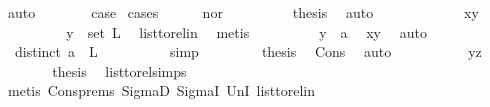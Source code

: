 \begin{isabellebody}
\ auto\isanewline
\ \ \ \ \isamarkupfalse%
\ \isamarkupfalse%
\ {\isacharquery}{\kern0pt}case\ \isamarkupfalse%
{\isacharparenleft}{\kern0pt}cases{\isacharparenright}{\kern0pt}\isanewline
\ \ \ \ \isamarkupfalse%
\ nor\isanewline
\ \ \ \ \ \ \isamarkupfalse%
\ \isamarkupfalse%
\ {\isacharquery}{\kern0pt}thesis\ \isamarkupfalse%
\ auto\isanewline
\ \ \ \ \isamarkupfalse%
\isanewline
\ \ \ \ \ \ \isamarkupfalse%
\ xy\ \isanewline
\ \ \ \ \ \ \isamarkupfalse%
\ \isamarkupfalse%
\ {\isachardoublequoteopen}y\ {\isasymin}\ set\ L{\isachardoublequoteclose}\ \isamarkupfalse%
\ list{\isacharunderscore}{\kern0pt}to{\isacharunderscore}{\kern0pt}rel{\isacharunderscore}{\kern0pt}in\ \isamarkupfalse%
\ metis\isanewline
\ \ \ \ \ \ \isamarkupfalse%
\ \isamarkupfalse%
\ {\isachardoublequoteopen}y\ {\isacharequal}{\kern0pt}\ a{\isachardoublequoteclose}\ \isamarkupfalse%
\ xy\ \isamarkupfalse%
\ auto\isanewline
\ \ \ \ \ \ \isamarkupfalse%
\ \isamarkupfalse%
\ {\isachardoublequoteopen}{\isasymnot}\ distinct\ {\isacharparenleft}{\kern0pt}a\ {\isacharhash}{\kern0pt}\ L{\isacharparenright}{\kern0pt}{\isachardoublequoteclose}\isanewline
\ \ \ \ \ \ \ \ \isamarkupfalse%
\ simp\ \isanewline
\ \ \ \ \isamarkupfalse%
\ \isamarkupfalse%
\ {\isacharquery}{\kern0pt}thesis\ \isamarkupfalse%
\ Cons\ \isamarkupfalse%
\ auto\isanewline
\ \ \ \ \isamarkupfalse%
\isanewline
\ \ \ \ \isamarkupfalse%
\ yz\isanewline
\ \ \ \ \isamarkupfalse%
\ \isamarkupfalse%
\ {\isacharquery}{\kern0pt}thesis\ \isamarkupfalse%
\ list{\isacharunderscore}{\kern0pt}to{\isacharunderscore}{\kern0pt}rel{\isachardot}{\kern0pt}simps{\isacharparenleft}{\kern0pt}{}{\isacharparenright}{\kern0pt}\isanewline
\ \ \ \ \ \ \isamarkupfalse%
\ {\isacharparenleft}{\kern0pt}metis\ Cons{\isachardot}{\kern0pt}prems{\isacharparenleft}{\kern0pt}{}{\isacharparenright}{\kern0pt}\ SigmaD{}\ SigmaI\ UnI{}\ list{\isacharunderscore}{\kern0pt}to{\isacharunderscore}{\kern0pt}rel{\isacharunderscore}{\kern0pt}in{\isacharparenright}{\kern0pt}\ \ \isanewline
\ \ \ \ \isamarkupfalse%

\end{isabellebody}
